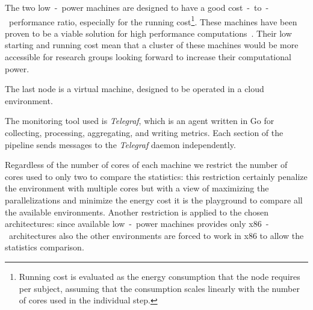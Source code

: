 \documentclass{standalone}
\begin{document}
The two low~-~power machines are designed to have a good cost~-~to~-~performance ratio, especially for the running cost\footnote{
  Running cost is evaluated as the energy consumption that the node requires per subject, assuming that the consumption scales linearly with the number of cores used in the individual step.
}.
These machines have been proven to be a viable solution for high performance computations~\cite{Cesini2017}.
Their low starting and running cost mean that a cluster of these machines would be more accessible for research groups looking forward to increase their computational power.

The last node is a virtual machine, designed to be operated in a cloud environment.

The monitoring tool used is \emph{Telegraf}, which is an agent written in Go for collecting, processing, aggregating, and writing metrics.
Each section of the pipeline sends messages to the \emph{Telegraf} daemon independently.

Regardless of the number of cores of each machine we restrict the number of cores used to only two to compare the statistics: this restriction certainly penalize the environment with multiple cores but with a view of maximizing the parallelizations and minimize the energy cost it is the playground to compare all the available environments.
Another restriction is applied to the chosen architectures: since available low~-~power machines provides only x86~-~architectures also the other environments are forced to work in x86 to allow the statistics comparison.
\end{document}
